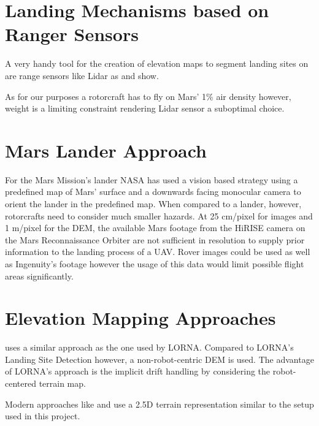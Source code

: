 \section{Landing Mechanisms based on Ranger Sensors}
A very handy tool for the creation of elevation maps to segment landing sites on are range sensors like Lidar as \citep{Trawny2015FlightTesting, Luna2017Evaluation, Johnson2002LidarBased} and \citep{Scherer2012AutonomousLanding} show. 

As for our purposes a rotorcraft has to fly on Mars' 1\% air density however, weight is a limiting constraint rendering Lidar sensor a suboptimal choice.

\section{Mars Lander Approach}
For the Mars Mission's lander NASA has used a vision based strategy using a predefined map of Mars' surface and a downwards facing monocular camera to orient the lander in the predefined map\citep{Johnson2020Mars2020}. When compared to a lander, however, rotorcrafts need to consider much smaller hazards. At 25 cm/pixel for images and 1 m/pixel for the DEM, the available Mars footage from the HiRISE camera on the Mars Reconnaissance Orbiter are not sufficient in resolution to supply prior information to the landing process of a UAV. Rover images could be used as well as Ingenuity's footage however the usage of this data would limit possible flight areas significantly.


\section{Elevation Mapping Approaches}
\citep{Johnson2005VisionGuided} uses a similar approach as the one used by LORNA. Compared to LORNA's Landing Site Detection \citep{LSD1,LSD2} however, a non-robot-centric DEM is used. The advantage of LORNA's approach is the implicit drift handling by considering the robot-centered terrain map.

Modern approaches like \citep{Fankhauser2014RobotCentric, Forster2015Continuous} and \citep{Daftry2018Robust} use a 2.5D terrain representation similar to the setup used in this project.

